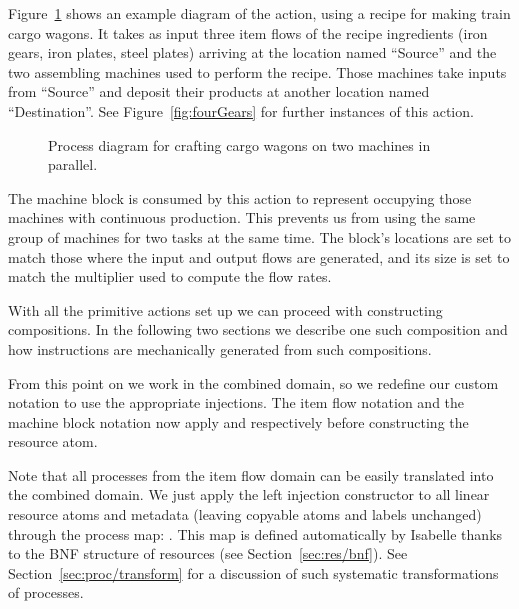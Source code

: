 \documentclass[class=smolathesis,crop=false]{standalone}
\begin{document}
Figure~\ref{fig:perform} shows an example diagram of the  action, using a recipe for making train cargo wagons.
It takes as input three item flows of the recipe ingredients (iron gears, iron plates, steel plates) arriving at the location named ``Source'' and the two assembling machines used to perform the recipe.
Those machines take inputs from ``Source'' and deposit their products at another location named ``Destination''.
See Figure~\ref{fig:fourGears} for further instances of this action.

\begin{figure}[htbp]
  \centering
  
  \caption{Process diagram for crafting cargo wagons on two machines in parallel.}
  \label{fig:perform}
\end{figure}

The machine block is consumed by this action to represent occupying those machines with continuous production.
This prevents us from using the same group of machines for two tasks at the same time.
The block's locations are set to match those where the input and output flows are generated, and its size is set to match the multiplier used to compute the flow rates.

With all the primitive actions set up we can proceed with constructing compositions.
In the following two sections we describe one such composition and how instructions are mechanically generated from such compositions.

From this point on we work in the combined domain, so we redefine our custom notation to use the appropriate injections.
The item flow notation  and the machine block notation  now apply  and  respectively before constructing the resource atom.

Note that all processes from the item flow domain can be easily translated into the combined domain.
We just apply the left injection constructor  to all linear resource atoms and metadata (leaving copyable atoms and labels unchanged) through the process map: .
This map is defined automatically by Isabelle thanks to the BNF structure of resources (see Section~\ref{sec:res/bnf}).
See Section~\ref{sec:proc/transform} for a discussion of such systematic transformations of processes.
\end{document}
